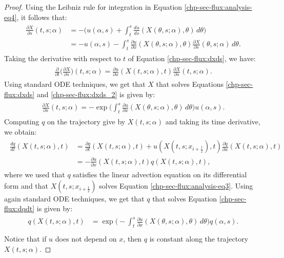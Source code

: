 \begin{proof}
	Using the Leibniz rule for integration in Equation \eqref{chp-sec-flux:analysis-eq4}, it follows that:
	\begin{align}
		\begin{split}
			\label{chp-sec-flux:dxds}
			\frac{\partial X}{\partial s} (t,s;\alpha) &= - \bigg(u(\alpha,s) + 
			\int_{t}^{s} \frac{du}{ds}(X(\theta,s;\alpha),\theta) \,d\theta \bigg)\\
			&=- u(\alpha,s) -
			\int_{t}^{s} \frac{\partial u}{\partial x}(X(\theta, s; \alpha),\theta) 
			\frac{\partial X}{\partial s} (\theta, s; \alpha)\,d\theta.
		\end{split}
	\end{align}
	Taking the derivative with respect to $t$ of Equation \eqref{chp-sec-flux:dxds}, we have:
	\begin{align}
		\begin{split}
			\label{chp-sec-flux:dxds_2}
			\frac{\partial }{\partial t} \bigg(\frac{\partial X}{\partial s} \bigg)
			(t,s;\alpha) = \frac{\partial u}{\partial x}(X(t, s; \alpha), t) 
			\frac{\partial X}{\partial s} (t, s; \alpha).
		\end{split}
	\end{align}
	Using standard ODE techniques, we get that $X$ that solves Equations \eqref{chp-sec-flux:dxds} and \eqref{chp-sec-flux:dxds_2}
	is given by:
	\begin{align}
		\begin{split}
			\label{chp-sec-flux:xs_int}
			\frac{\partial X}{\partial s}(t,s;\alpha) = -
			\exp{\bigg(\int_{t}^{s} \frac{\partial u}{\partial x}(X(\theta,s;\alpha),\theta)  \,d\theta \bigg)}
			u(\alpha,s).
		\end{split}
	\end{align}
	Computing $q$ on the trajectory give by $X(t,s;\alpha)$ and taking
	its time derivative, we obtain:
	\begin{align}
		\label{chp-sec-flux:dqdt}
		\begin{split}
			\frac{dq}{dt} (X(t,s;\alpha),t) &= 
			\frac{\partial q}{\partial t} (X(t,s;\alpha),t)+
			u (X(t,s;x_{i+\frac{1}{2}}),t)\frac{\partial q}{\partial x} (X(t,s;\alpha),t) \\
			&= -\frac{\partial u}{\partial x}(X(t,s;\alpha),t)  q (X(t,s;\alpha),t),
		\end{split}
	\end{align}
	where we used that $q$ satisfies the linear advection equation on its differential form and that $X(t,s;x_{i+\frac{1}{2}})$
	solves Equation \eqref{chp-sec-flux:analysis-eq3}.
	Using again standard ODE techniques, we get that $q$ that solves Equation \eqref{chp-sec-flux:dqdt}
	is given by:
	\begin{align}
		\begin{split}
			\label{chp-sec-flux:q_int}
			q(X(t,s;\alpha),t) &= 
			\exp{\bigg(-\int_{t}^{s} \frac{\partial u}{\partial x}(X(\theta,s;\alpha),\theta)  \,d\theta \bigg)}
			q(\alpha,s).\\
		\end{split}
	\end{align}
	Notice that if $u$ does not depend on $x$, then $q$ is constant along the trajectory $X(t,s;\alpha)$.
	

\end{proof}
